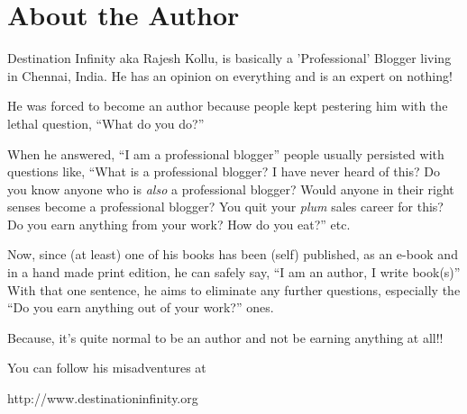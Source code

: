 \chapter*{About the Author}

Destination Infinity aka Rajesh Kollu, is basically a 'Professional' Blogger
living in Chennai, India. He has an opinion on everything and is an expert on
nothing!

He was forced to become an author because people kept pestering him with the
lethal question, “What do you do?”

When he answered, “I am a professional blogger” people usually persisted with
questions like, “What is a professional blogger? I have never heard of this? Do
you know anyone who is \emph{also} a professional blogger? Would anyone in their
right senses become a professional blogger? You quit your \emph{plum} sales
career for this? Do you earn anything from your work? How do you eat?” etc.

Now, since (at least) one of his books has been (self) published, as an e-book
and in a hand made print edition, he can safely say, “I am an author, I write
book(s)” With that one sentence, he aims to eliminate any further questions,
especially the “Do you earn anything out of your work?” ones.

Because, it's quite normal to be an author and not be earning anything at all!!
\faGrinBeam[regular]

You can follow his misadventures at

\vspace{1ex}

\centerline{http://www.destinationinfinity.org}

\chapter{}
